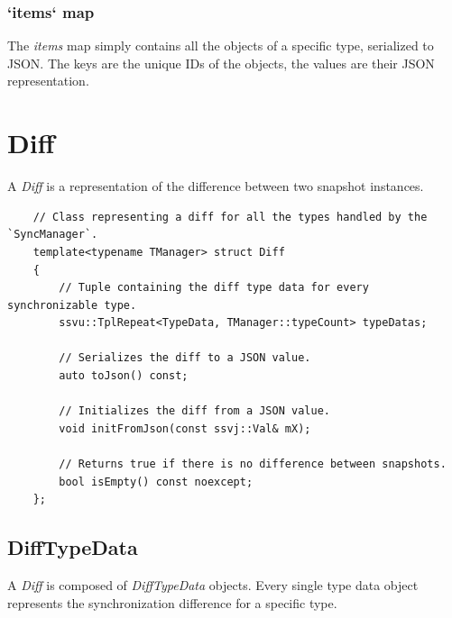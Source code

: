 \documentclass{report}
\begin{document}
                \subsubsection{`items` map}

                    The \emph{items} map simply contains all the objects of a specific type, serialized to JSON.
                    The keys are the unique IDs of the objects, the values are their JSON representation.
            
        \section{Diff}

            A \emph{Diff} is a representation of the difference between two snapshot instances.

\begin{verbatim}
    // Class representing a diff for all the types handled by the `SyncManager`.
    template<typename TManager> struct Diff
    {
        // Tuple containing the diff type data for every synchronizable type.
        ssvu::TplRepeat<TypeData, TManager::typeCount> typeDatas;

        // Serializes the diff to a JSON value.
        auto toJson() const;

        // Initializes the diff from a JSON value.
        void initFromJson(const ssvj::Val& mX);

        // Returns true if there is no difference between snapshots.
        bool isEmpty() const noexcept;
    };
\end{verbatim}

            \subsection{DiffTypeData}

                A \emph{Diff} is composed of \emph{DiffTypeData} objects. 
                Every single type data object represents the synchronization difference for a specific type.
\end{document}
